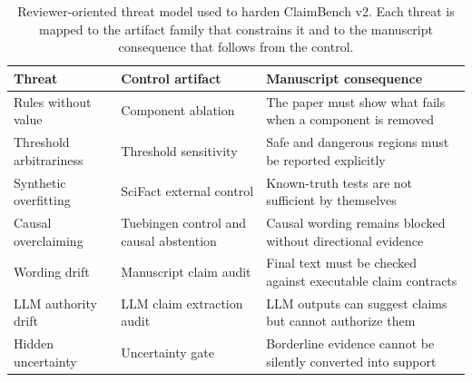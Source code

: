 \begin{table}[t]
\centering
\caption{Reviewer-oriented threat model used to harden ClaimBench v2. Each threat is mapped to the artifact family that constrains it and to the manuscript consequence that follows from the control.}
\label{tab:threat-model}
\small
\begin{tabularx}{\textwidth}{p{}p{}X}
\toprule
Threat & Control artifact & Manuscript consequence \\
\midrule
Rules without value & Component ablation & The paper must show what fails when a component is removed \\
Threshold arbitrariness & Threshold sensitivity & Safe and dangerous regions must be reported explicitly \\
Synthetic overfitting & SciFact external control & Known-truth tests are not sufficient by themselves \\
Causal overclaiming & Tuebingen control and causal abstention & Causal wording remains blocked without directional evidence \\
Wording drift & Manuscript claim audit & Final text must be checked against executable claim contracts \\
LLM authority drift & LLM claim extraction audit & LLM outputs can suggest claims but cannot authorize them \\
Hidden uncertainty & Uncertainty gate & Borderline evidence cannot be silently converted into support \\
\bottomrule
\end{tabularx}
\end{table}
